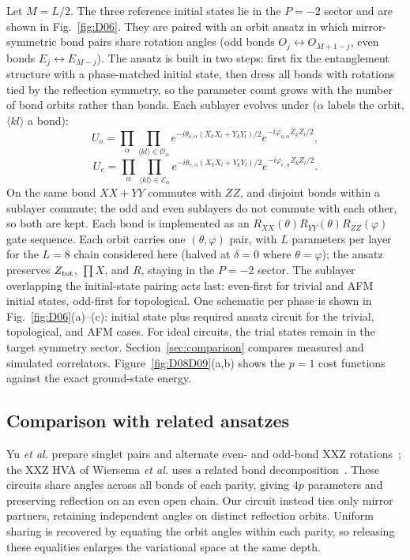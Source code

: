 Let $M=L/2$. The three reference initial states lie in the $P=-2$ sector and are shown in Fig.~\ref{fig:D06}. They are paired with an
orbit ansatz in which mirror-symmetric bond pairs share rotation angles
(odd bonds $O_j\leftrightarrow O_{M+1-j}$, even bonds
$E_j\leftrightarrow E_{M-j}$). The ansatz is built in two steps:
first fix the entanglement structure with a phase-matched initial state,
then dress all bonds with rotations tied by the reflection symmetry, so
the parameter count grows with the number of bond orbits rather than
bonds. Each sublayer evolves under ($\alpha$ labels the orbit,
$\langle kl\rangle$ a bond):
\begin{equation}
U_{o}=\prod_{\alpha}\prod_{\langle kl\rangle\in\mathcal{O}_{\alpha}}e^{-i\theta_{o,\alpha}(X_{k}X_{l}+Y_{k}Y_{l})/2}e^{-i\varphi_{o,\alpha}Z_{k}Z_{l}/2},
\end{equation}
\begin{equation}
U_{e}=\prod_{\alpha}\prod_{\langle kl\rangle\in\mathcal{E}_{\alpha}}e^{-i\theta_{e,\alpha}(X_{k}X_{l}+Y_{k}Y_{l})/2}e^{-i\varphi_{e,\alpha}Z_{k}Z_{l}/2}.
\end{equation}
On the same bond $XX{+}YY$ commutes with $ZZ$, and disjoint bonds within
a sublayer commute; the odd and even sublayers do not commute with each
other, so both are kept. Each bond is implemented as an
$R_{XX}(\theta)R_{YY}(\theta)R_{ZZ}(\varphi)$ gate sequence. Each orbit
carries one $(\theta,\varphi)$ pair, with $L$ parameters per layer for the $L=8$ chain considered here (halved
at $\delta=0$ where $\theta=\varphi$); the ansatz preserves
$Z_{\rm tot}$, $\prod X$, and $R$, staying in the $P=-2$ sector. The
sublayer overlapping the initial-state pairing acts last: even-first
for trivial and AFM initial states, odd-first for topological. One schematic per phase is shown in Fig.~\ref{fig:D06}(a)--(c): initial state
plus required ansatz circuit for the trivial, topological, and
AFM cases.
For ideal circuits, the trial states remain in the target symmetry sector. Section~\ref{sec:comparison} compares measured and simulated correlators.
Figure~\ref{fig:D08D09}(a,b) shows the $p=1$ cost functions
against the exact ground-state energy.

\subsection{Comparison with related ansatzes}
\label{sec:ansatz-comparison}

Yu \textit{et al.} prepare singlet pairs and alternate even- and odd-bond XXZ rotations~\cite{yu2023simulating}; the XXZ HVA of Wiersema \textit{et al.} uses a related bond decomposition~\cite{wiersema2020exploring}.
These circuits share angles across all bonds of each parity, giving $4p$ parameters and preserving reflection on an even open chain.
Our circuit instead ties only mirror partners, retaining independent angles on distinct reflection orbits.
Uniform sharing is recovered by equating the orbit angles within each parity, so releasing these equalities enlarges the variational space at the same depth.

